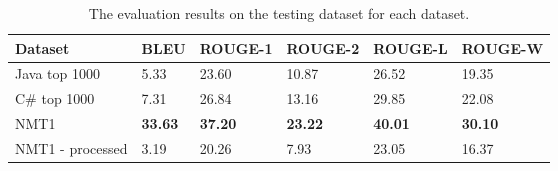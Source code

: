 \begin{table*}[]
\caption{The evaluation results on the testing dataset for each dataset.}
\label{tbl:results}
\begin{tabular}{@{}llllll@{}}
\toprule
\textbf{Dataset} & \textbf{BLEU} & \textbf{ROUGE-1} & \textbf{ROUGE-2} & \textbf{ROUGE-L} & \textbf{ROUGE-W} \\ \midrule
Java top 1000                        & 5.33  & 23.60   & 10.87   & 26.52   & 19.35   \\
C\# top 1000                         & 7.31  & 26.84   & 13.16   & 29.85   & 22.08   \\
NMT1 \cite{jiang_automatically_2017} & \textbf{33.63} & \textbf{37.20}   & \textbf{23.22}   & \textbf{40.01}   & \textbf{30.10}   \\
NMT1 - processed                     & 3.19  & 20.26   & 7.93   & 23.05   & 16.37   \\ \bottomrule
\end{tabular}
\end{table*}

